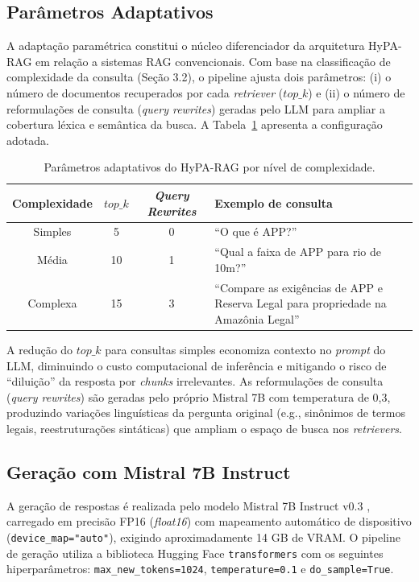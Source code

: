 \documentclass[12pt]{article}
\begin{document}
\subsection{Parâmetros Adaptativos}

A adaptação paramétrica constitui o núcleo diferenciador da arquitetura HyPA-RAG em relação a sistemas RAG convencionais. Com base na classificação de complexidade da consulta (Seção 3.2), o pipeline ajusta dois parâmetros: (i) o número de documentos recuperados por cada \textit{retriever} ($top\_k$) e (ii) o número de reformulações de consulta (\textit{query rewrites}) geradas pelo LLM para ampliar a cobertura léxica e semântica da busca. A Tabela~\ref{tab:parâmetros} apresenta a configuração adotada.

\begin{table}[ht]
\centering
\caption{Parâmetros adaptativos do HyPA-RAG por nível de complexidade.}
\label{tab:parâmetros}
\begin{tabular}{cccp{5.5cm}}
\toprule
\textbf{Complexidade} & \textbf{$top\_k$} & \textbf{\textit{Query Rewrites}} & \textbf{Exemplo de consulta} \\
\midrule
Simples & 5 & 0 & ``O que é APP?'' \\
Média & 10 & 1 & ``Qual a faixa de APP para rio de 10m?'' \\
Complexa & 15 & 3 & ``Compare as exigências de APP e Reserva Legal para propriedade na Amazônia Legal'' \\
\bottomrule
\end{tabular}
\end{table}

A redução do $top\_k$ para consultas simples economiza contexto no \textit{prompt} do LLM, diminuindo o custo computacional de inferência e mitigando o risco de ``diluição'' da resposta por \textit{chunks} irrelevantes. As reformulações de consulta (\textit{query rewrites}) são geradas pelo próprio Mistral 7B com temperatura de 0,3, produzindo variações linguísticas da pergunta original (e.g., sinônimos de termos legais, reestruturações sintáticas) que ampliam o espaço de busca nos \textit{retrievers}.

\subsection{Geração com Mistral 7B Instruct}

A geração de respostas é realizada pelo modelo Mistral 7B Instruct v0.3 \cite{jiang:2023}, carregado em precisão FP16 (\textit{float16}) com mapeamento automático de dispositivo (\texttt{device\_map="auto"}), exigindo aproximadamente 14 GB de VRAM. O pipeline de geração utiliza a biblioteca Hugging Face \texttt{transformers} com os seguintes hiperparâmetros: \texttt{max\_new\_tokens=1024}, \texttt{temperature=0.1} e \texttt{do\_sample=True}.
\end{document}
